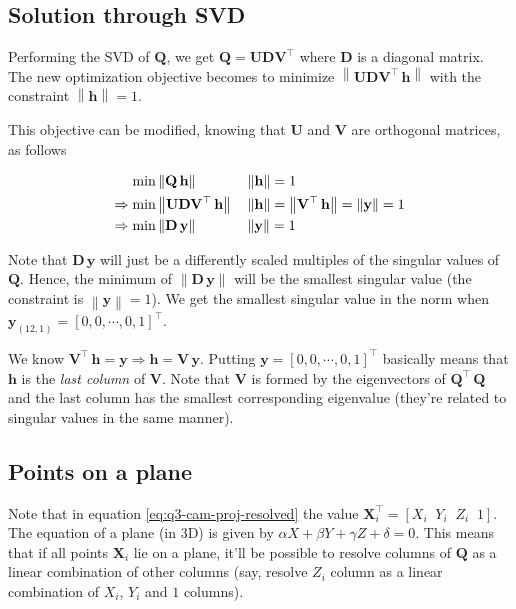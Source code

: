 \subsection{Solution through SVD}

Performing the SVD of $\mathbf{Q}$, we get $\mathbf{Q} = \mathbf{U D V^\top}$ where $\mathbf{D}$ is a diagonal matrix. The new optimization objective becomes to minimize $\left \| \mathbf{U D V^\top \, h} \right \|$ with the constraint $\left \| \mathbf{h} \right \| = 1$.

This objective can be modified, knowing that $\mathbf{U}$ and $\mathbf{V}$ are orthogonal matrices, as follows

\begin{align}
    \textup{min}& \left \| \mathbf{Q \, h} \right \|
    &&
    \left \| \mathbf{h} \right \| = 1
    \nonumber \\
    \Rightarrow \textup{min}& \left \| \mathbf{U D V^\top \, h} \right \|
    &&
    \left \| \mathbf{h} \right \| = \left \| \mathbf{V^\top \, h} \right \| = \left \| \mathbf{y} \right \| = 1 \nonumber \\
    \Rightarrow \textup{min}& \left \| \mathbf{D \, y} \right \|
    &&
    \left \| \mathbf{y} \right \| = 1
    \nonumber
\end{align}

Note that $\mathbf{D \, y}$ will just be a differently scaled multiples of the singular values of $\mathbf{Q}$. Hence, the minimum of $\left \| \mathbf{D \, y} \right \|$ will be the smallest singular value (the constraint is $\left \| \mathbf{y} \right \| = 1$). We get the smallest singular value in the norm when $\mathbf{y}_{(12, 1)} = \left [ 0, 0, \cdots  , 0, 1 \right ]^\top$.

We know $\mathbf{V^\top \, h} = \mathbf{y} \Rightarrow \mathbf{h} = \mathbf{V \, y}$. Putting $\mathbf{y} = \left [ 0, 0, \cdots  , 0, 1 \right ]^\top$ basically means that $\mathbf{h}$ is the \textit{last column} of $\mathbf{V}$. Note that $\mathbf{V}$ is formed by the eigenvectors of $\mathbf{Q^\top \, Q}$ and the last column has the smallest corresponding eigenvalue (they're related to singular values in the same manner).

\subsection{Points on a plane}

Note that in equation \ref{eq:q3-cam-proj-resolved} the value $\mathbf{X}_i^\top = \left [ X_i \;\; Y_i \;\; Z_i \;\; 1\right ]$. The equation of a plane (in 3D) is given by $\alpha X + \beta Y + \gamma Z + \delta = 0$. This means that if all points $\mathbf{X}_i$ lie on a plane, it'll be possible to resolve columns of $\mathbf{Q}$ as a linear combination of other columns (say, resolve $Z_i$ column as a linear combination of $X_i$, $Y_i$ and $1$ columns). 

